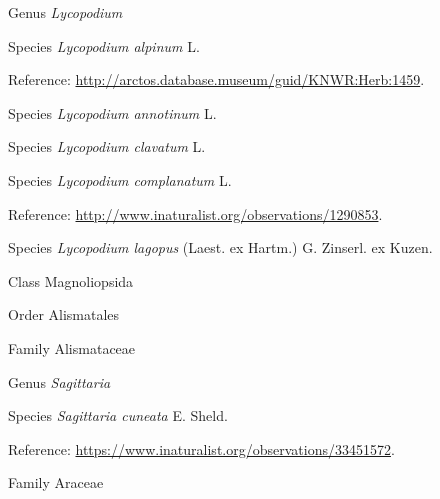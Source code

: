 \documentclass[9pt, article]{memoir}
\begin{document}
\begin{multicols}{2}
\vspace{6pt}\noindent\hspace{30pt}Genus \textit{Lycopodium}


\vspace{6pt}\noindent\hspace{36pt}Species \textit{Lycopodium alpinum} L.


\vspace{6pt}Reference: 
\url{http://arctos.database.museum/guid/KNWR:Herb:1459}.

\vspace{6pt}\noindent\hspace{36pt}Species \textit{Lycopodium annotinum} L.


\vspace{6pt}\noindent\hspace{36pt}Species \textit{Lycopodium clavatum} L.


\vspace{6pt}\noindent\hspace{36pt}Species \textit{Lycopodium complanatum} L.


\vspace{6pt}Reference: 
\url{http://www.inaturalist.org/observations/1290853}.

\vspace{6pt}\noindent\hspace{36pt}Species \textit{Lycopodium lagopus} (Laest. ex Hartm.) G. Zinserl. ex Kuzen.


\vspace{6pt}\noindent\hspace{12pt}Class Magnoliopsida


\vspace{6pt}\noindent\hspace{18pt}Order Alismatales


\vspace{6pt}\noindent\hspace{24pt}Family Alismataceae


\vspace{6pt}\noindent\hspace{30pt}Genus \textit{Sagittaria}


\vspace{6pt}\noindent\hspace{36pt}Species \textit{Sagittaria cuneata} E. Sheld.


\vspace{6pt}Reference: 
\url{https://www.inaturalist.org/observations/33451572}.

\vspace{6pt}\noindent\hspace{24pt}Family Araceae



\end{multicols}
\end{document}

